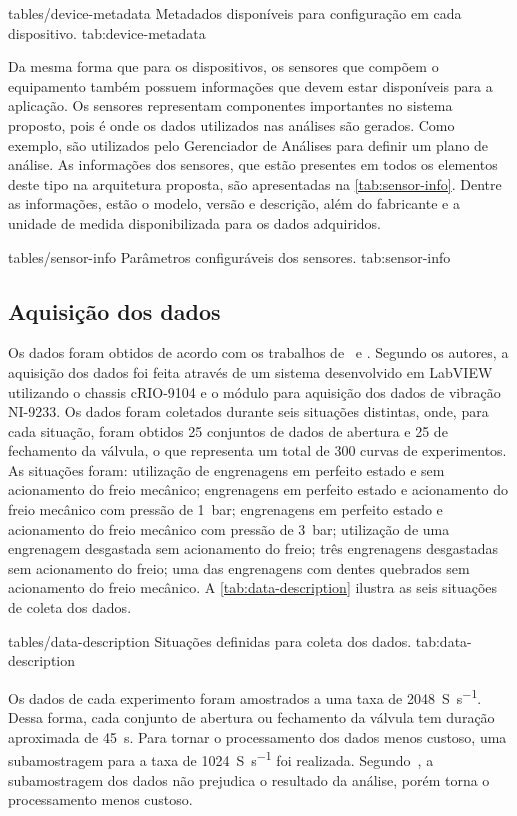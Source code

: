   {tables/device-metadata}
  {Metadados disponíveis para configuração em cada dispositivo.}
  {tab:device-metadata}

Da mesma forma que para os dispositivos, os sensores que compõem o equipamento também possuem
informações que devem estar disponíveis para a aplicação. Os sensores representam componentes
importantes no sistema proposto, pois é onde os dados utilizados nas análises são gerados. Como
exemplo, são utilizados pelo Gerenciador de Análises para definir um plano de análise. As
informações dos sensores, que estão presentes em todos os elementos deste tipo na arquitetura
proposta, são apresentadas na \cref{tab:sensor-info}. Dentre as informações, estão o modelo, versão
e descrição, além do fabricante e a unidade de medida disponibilizada para os dados adquiridos.

  {tables/sensor-info}
  {Parâmetros configuráveis dos sensores.}
  {tab:sensor-info}


\subsection{Aquisição dos dados}
\label{sub:estudo-caso-aquisicao-dados}

Os dados foram obtidos de acordo com os trabalhos de~\cite{boesch2011deteccao} e
\cite{faccin2011manutencao}. Segundo os autores, a aquisição dos dados foi feita através de um
sistema desenvolvido em LabVIEW utilizando o chassis {cRIO-9104} e o módulo para aquisição dos dados
de vibração {NI-9233}. Os dados foram coletados durante seis situações distintas, onde, para cada
situação, foram obtidos \num{25} conjuntos de dados de abertura e \num{25} de fechamento da válvula,
o que representa um total de \num{300} curvas de experimentos. As situações foram: utilização de
engrenagens em perfeito estado e sem acionamento do freio mecânico; engrenagens em perfeito estado e
acionamento do freio mecânico com pressão de \SI{1}{\bar}; engrenagens em perfeito estado e
acionamento do freio mecânico com pressão de \SI{3}{\bar}; utilização de uma engrenagem desgastada
sem acionamento do freio; três engrenagens desgastadas sem acionamento do freio; uma das engrenagens
com dentes quebrados sem acionamento do freio mecânico. A \cref{tab:data-description} ilustra as
seis situações de coleta dos dados.

  {tables/data-description}
  {Situações definidas para coleta dos dados.}
  {tab:data-description}

Os dados de cada experimento foram amostrados a uma taxa de \SI{2048}{S\per\second}. Dessa forma,
cada conjunto de abertura ou fechamento da válvula tem duração aproximada de \SI{45}{\second}. Para
tornar o processamento dos dados menos custoso, uma subamostragem para a taxa de
\SI{1024}{S\per\second} foi realizada. Segundo~\cite{faccin2011manutencao}, a subamostragem dos
dados não prejudica o resultado da análise, porém torna o processamento menos custoso.


